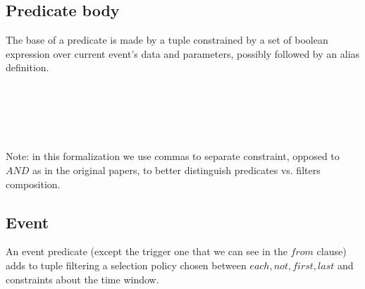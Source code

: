\subsection{Predicate body}
The base of a predicate is made by a tuple constrained by a set of boolean expression over current event's data and parameters, possibly followed by an alias definition.
\begin{bnf*}
\\
\\
\\
\\
\end{bnf*}
Note: in this formalization we use commas to separate constraint, opposed to $AND$ as in the original papers, to better distinguish predicates vs. filters composition.

\subsection{Event}
An event predicate (except the trigger one that we can see in the $from$ clause) adds to tuple filtering a selection policy chosen between $each, not, first, last$ and constraints about the time window.
\begin{bnf*}
\\
\end{bnf*}

